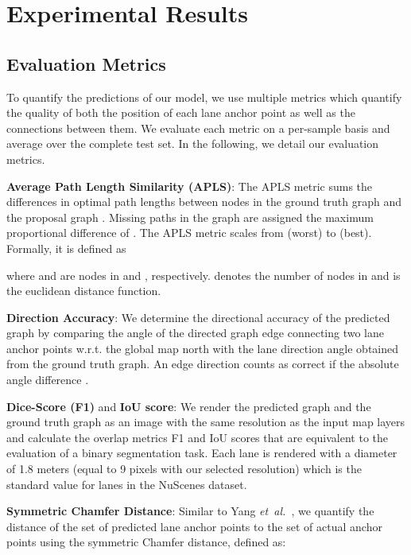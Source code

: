 \documentclass[letterpaper, 10 pt, conference]{ieeeconf}
\newcommand{\etal}{\emph{et~al.~}}
\begin{document}
 

\section{Experimental Results}
\label{sec:experiments}

\subsection{Evaluation Metrics}

To quantify the predictions of our model, we use multiple metrics which quantify the quality of both the position of each lane anchor point as well as the connections between them. We evaluate each metric on a per-sample basis and average over the complete test set. In the following, we detail our evaluation metrics.


\textbf{Average Path Length Similarity (APLS)}: The APLS metric \cite{van2018spacenet} sums the differences in optimal path lengths between nodes in the ground truth graph  and the proposal graph . Missing paths in the graph are assigned the maximum proportional difference of . The APLS metric scales from  (worst) to  (best). Formally, it is defined as
    
    


where  and  are nodes in  and , respectively.  denotes the number of nodes in  and  is the euclidean distance function.

\textbf{\textbf{Direction Accuracy}}: We determine the directional accuracy of the predicted graph by comparing the angle of the directed graph edge connecting two lane anchor points w.r.t. the global map north with the lane direction angle obtained from the ground truth graph. An edge direction counts as correct if the absolute angle difference .


\textbf{Dice-Score (F1)} and \textbf{IoU score}: We render the predicted graph and the ground truth graph as an image with the same resolution as the input map layers and calculate the overlap metrics F1 and IoU scores that are equivalent to the evaluation of a binary segmentation task. Each lane is rendered with a diameter of 1.8 meters (equal to 9 pixels with our selected resolution) which is the standard value for lanes in the NuScenes dataset.
    
    
\textbf{Symmetric Chamfer Distance}: Similar to Yang \etal \cite{yang2018graph}, we quantify the distance of the set of predicted lane anchor points  to the set of actual anchor points  using the symmetric Chamfer distance, defined as:
\end{document}
